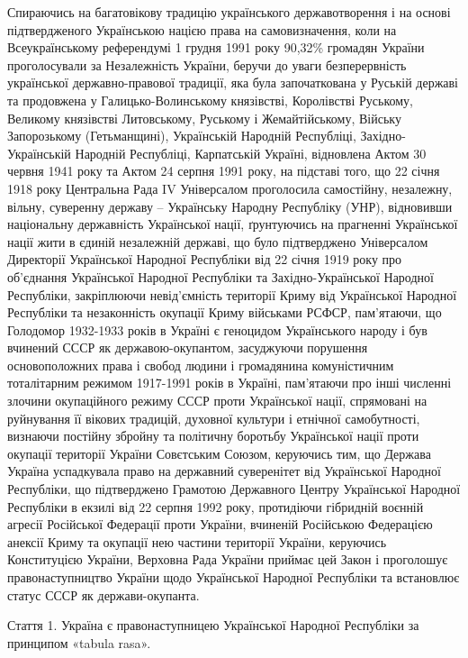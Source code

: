 Спираючись на багатовікову традицію українського державотворення і на основі
підтвердженого Українською нацією права на самовизначення, коли на
Всеукраїнському референдумі 1 грудня 1991 року 90,32\% громадян України
проголосували за Незалежність України, беручи до уваги безперервність
української державно-правової традиції, яка була започаткована у Руській
державі та продовжена у Галицько-Волинському князівстві, Королівстві Руському,
Великому князівстві Литовському, Руському і Жемайтійському, Війську
Запорозькому (Гетьманщині), Українській Народній Республіці,
Західно-Українській Народній Республіці, Карпатській Україні, відновлена Актом
30 червня 1941 року та Актом 24 серпня 1991 року, на підставі того, що 22 січня
1918 року Центральна Рада IV Універсалом проголосила самостійну, незалежну,
вільну, суверенну державу – Українську Народну Республіку (УНР), відновивши
національну державність Української нації, ґрунтуючись на прагненні Української
нації жити в єдиній незалежній державі, що було підтверджено Універсалом
Директорії Української Народної Республіки від 22 січня 1919 року про
об’єднання Української Народної Республіки та Західно-Української Народної
Республіки, закріплюючи невід’ємність території Криму від Української Народної
Республіки та незаконність окупації Криму військами РСФСР, пам’ятаючи, що
Голодомор 1932-1933 років в Україні є геноцидом Українського народу і був
вчинений СССР як державою-окупантом, засуджуючи порушення основоположних права
і свобод людини і громадянина комуністичним тоталітарним режимом 1917-1991
років в Україні, пам’ятаючи про інші численні злочини окупаційного режиму СССР
проти Української нації, спрямовані на руйнування її вікових традицій, духовної
культури і етнічної самобутності, визнаючи постійну збройну та політичну
боротьбу Української нації проти окупації території України Совєтським Союзом,
керуючись тим, що Держава Україна успадкувала право на державний суверенітет
від Української Народної Республіки, що підтверджено Грамотою Державного Центру
Української Народної Республіки в екзилі від 22 серпня 1992 року, протидіючи
гібридній воєнній агресії Російської Федерації проти України, вчиненій
Російською Федерацією анексії Криму та окупації нею частини території України,
керуючись Конституцією України, Верховна Рада України приймає цей Закон і
проголошує правонаступництво України щодо Української Народної Республіки та
встановлює статус СССР як держави-окупанта.

Стаття 1. Україна є правонаступницею Української Народної Республіки за принципом «tabula rasa».

